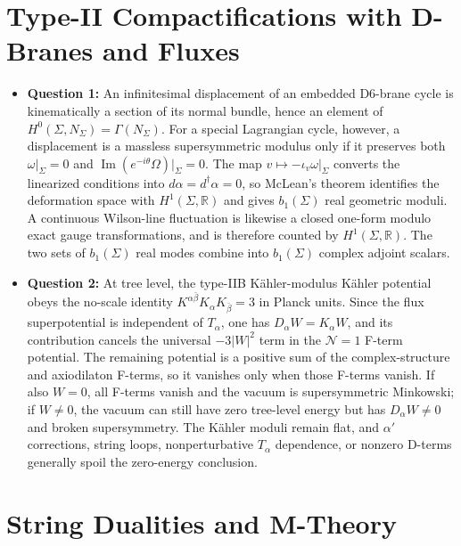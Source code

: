 \documentclass[
  10pt,
  a4paper,
  openany]{book}
\providecommand{\tightlist}{%
  \setlength{\itemsep}{0pt}\setlength{\parskip}{0pt}}
\begin{document}
\section{Type-II Compactifications with D-Branes and
Fluxes}\label{type-ii-compactifications-with-d-branes-and-fluxes}

\begin{itemize}
\tightlist
\item
  \textbf{Question 1:} An infinitesimal displacement of an embedded
  D6-brane cycle is kinematically a section of its normal bundle, hence
  an element of \(H^0(\Sigma,N_\Sigma)=\Gamma(N_\Sigma)\). For a special
  Lagrangian cycle, however, a displacement is a massless supersymmetric
  modulus only if it preserves both \(\omega|_\Sigma=0\) and
  \(\operatorname{Im}(e^{-i\theta}\Omega)|_\Sigma=0\). The map
  \(v\mapsto-\iota_v\omega|_\Sigma\) converts the linearized conditions
  into \(d\alpha=d^\dagger\alpha=0\), so McLean's theorem identifies the
  deformation space with \(H^1(\Sigma,\mathbb R)\) and gives
  \(b_1(\Sigma)\) real geometric moduli. A continuous Wilson-line
  fluctuation is likewise a closed one-form modulo exact gauge
  transformations, and is therefore counted by
  \(H^1(\Sigma,\mathbb R)\). The two sets of \(b_1(\Sigma)\) real modes
  combine into \(b_1(\Sigma)\) complex adjoint scalars.
\item
  \textbf{Question 2:} At tree level, the type-IIB Kähler-modulus Kähler
  potential obeys the no-scale identity
  \(K^{\alpha\bar\beta}K_\alpha K_{\bar\beta}=3\) in Planck units. Since
  the flux superpotential is independent of \(T_\alpha\), one has
  \(D_\alpha W=K_\alpha W\), and its contribution cancels the universal
  \(-3|W|^2\) term in the \(\mathcal N=1\) F-term potential. The
  remaining potential is a positive sum of the complex-structure and
  axiodilaton F-terms, so it vanishes only when those F-terms vanish. If
  also \(W=0\), all F-terms vanish and the vacuum is supersymmetric
  Minkowski; if \(W\neq0\), the vacuum can still have zero tree-level
  energy but has \(D_\alpha W\neq0\) and broken supersymmetry. The
  Kähler moduli remain flat, and \(\alpha'\) corrections, string loops,
  nonperturbative \(T_\alpha\) dependence, or nonzero D-terms generally
  spoil the zero-energy conclusion.
\end{itemize}

\section{String Dualities and
M-Theory}\label{string-dualities-and-m-theory}
\end{document}
